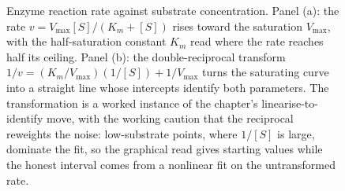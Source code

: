 \begin{figure}[htbp]
\caption[Michaelis-Menten kinetics and the Lineweaver-Burk
linearisation]{Enzyme reaction rate against substrate concentration. Panel
(a): the rate $v = V_{\max}[S]/(K_m+[S])$ rises toward the saturation
$V_{\max}$, with the half-saturation constant $K_m$ read where the rate
reaches half its ceiling. Panel (b): the double-reciprocal transform
$1/v = (K_m/V_{\max})(1/[S]) + 1/V_{\max}$ turns the saturating curve into
a straight line whose intercepts identify both parameters. The
transformation is a worked instance of the chapter's linearise-to-identify
move, with the working caution that the reciprocal reweights the noise:
low-substrate points, where $1/[S]$ is large, dominate the fit, so the
graphical read gives starting values while the honest interval comes from
a nonlinear fit on the untransformed rate.}
\label{fig:vol02ch18:michaelis-menten}
\end{figure}
